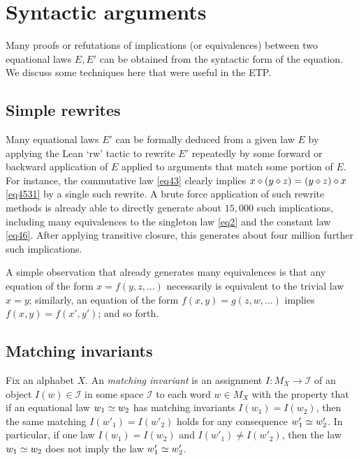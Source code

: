 
\section{Syntactic arguments}\label{syntactic-sec}

Many proofs or refutations of implications (or equivalences) between two equational laws $E,E'$ can be obtained from the syntactic form of the equation.  We discuss some techniques here that were useful in the ETP.

\subsection{Simple rewrites}\label{rewrite-sec}

Many equational laws $E'$ can be formally deduced from a given law $E$ by applying the Lean `rw' tactic to rewrite $E'$ repeatedly by some forward or backward application of $E$ applied to arguments that match some portion of $E$.  For instance, the commutative law \eqref{eq43} clearly implies $x \diamond (y \diamond z) = (y \diamond z) \diamond x$ \eqref{eq4531}
by a single such rewrite.  A brute force application of such rewrite methods is already able to directly generate about $15,000$ such implications, including many equivalences to the singleton law \eqref{eq2} and the constant law \eqref{eq46}.  After applying transitive closure, this generates about four million further such implications.

A simple observation that already generates many equivalences is that any equation of the form $x = f(y,z,\dots)$ necessarily is equivalent to the trivial law $x = y$; similarly, an equation of the form $f(x,y) = g(z,w,\dots)$ implies $f(x,y) = f(x',y')$; and so forth.

\subsection{Matching invariants}

Fix an alphabet $X$. An \emph{matching invariant} is an assignment $I \colon M_X \to {\mathcal I}$ of an object $I(w) \in {\mathcal I}$ in some space ${\mathcal I}$ to each word $w \in M_X$ with the property that if an equational law $w_1 \simeq w_2$ has matching invariants $I(w_1)=I(w_2)$, then the same matching $I(w'_1) = I(w'_2)$ holds for any consequence $w'_1 \simeq w'_2$.  In particular, if one law $I(w_1)=I(w_2)$ and $I(w'_1) \neq I(w'_2)$, then the law $w_1 \simeq w_2$ does not imply the law $w'_1 \simeq w'_2$.

